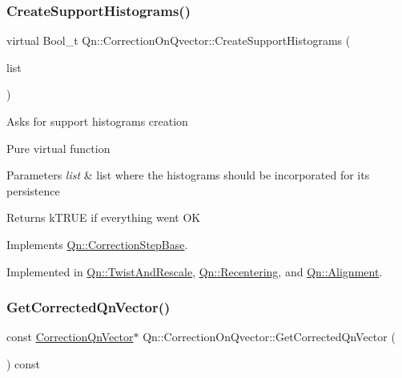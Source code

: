 \subsubsection{\texorpdfstring{Create\+Support\+Histograms()}{CreateSupportHistograms()}}
{\footnotesize\ttfamily virtual Bool\+\_\+t Qn\+::\+Correction\+On\+Qvector\+::\+Create\+Support\+Histograms (\begin{DoxyParamCaption}\item[{T\+List $\ast$}]{list }\end{DoxyParamCaption})\hspace{0.3cm}{\ttfamily [pure virtual]}}

Asks for support histograms creation

Pure virtual function 
\begin{DoxyParams}{Parameters}
{\em list} & list where the histograms should be incorporated for its persistence \\
\hline
\end{DoxyParams}
\begin{DoxyReturn}{Returns}
k\+T\+R\+UE if everything went OK 
\end{DoxyReturn}


Implements \mbox{\hyperlink{classQn_1_1CorrectionStepBase_a156c05dc7a6a8e149674ccfb11e596c9}{Qn\+::\+Correction\+Step\+Base}}.



Implemented in \mbox{\hyperlink{classQn_1_1TwistAndRescale_a57826092f0c09750fe0f5919e2cdb617}{Qn\+::\+Twist\+And\+Rescale}}, \mbox{\hyperlink{classQn_1_1Recentering_accf0f1282e35bd0a94a2d93312ff6ad5}{Qn\+::\+Recentering}}, and \mbox{\hyperlink{classQn_1_1Alignment_ada53d00555fc8a59644b3db5a8584de3}{Qn\+::\+Alignment}}.

\mbox{\label{classQn_1_1CorrectionOnQvector_a3d6ef2f88326076972684d1d4115f5ab}} 
\subsubsection{\texorpdfstring{Get\+Corrected\+Qn\+Vector()}{GetCorrectedQnVector()}}
{\footnotesize\ttfamily const \mbox{\hyperlink{classQn_1_1CorrectionQnVector}{Correction\+Qn\+Vector}}$\ast$ Qn\+::\+Correction\+On\+Qvector\+::\+Get\+Corrected\+Qn\+Vector (\begin{DoxyParamCaption}{ }\end{DoxyParamCaption}) const\hspace{0.3cm}{\ttfamily [inline]}}

